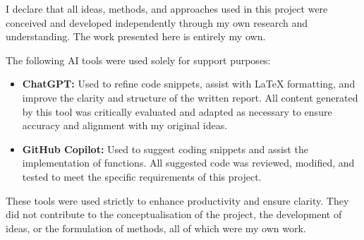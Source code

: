 \documentclass[a4paper,12pt]{article}
\begin{document}
I declare that all ideas, methods, and approaches used in this project were conceived and developed independently through my own research and understanding. The work presented here is entirely my own.

The following AI tools were used solely for support purposes:
\begin{itemize}
    \item \textbf{ChatGPT:} Used to refine code snippets, assist with LaTeX formatting, and improve the clarity and structure of the written report. All content generated by this tool was critically evaluated and adapted as necessary to ensure accuracy and alignment with my original ideas.
    \item \textbf{GitHub Copilot:} Used to suggest coding snippets and assist the implementation of functions. All suggested code was reviewed, modified, and tested to meet the specific requirements of this project.
\end{itemize}

These tools were used strictly to enhance productivity and ensure clarity. They did not contribute to the conceptualisation of the project, the development of ideas, or the formulation of methods, all of which were my own work.



\printbibliography
\end{document}
